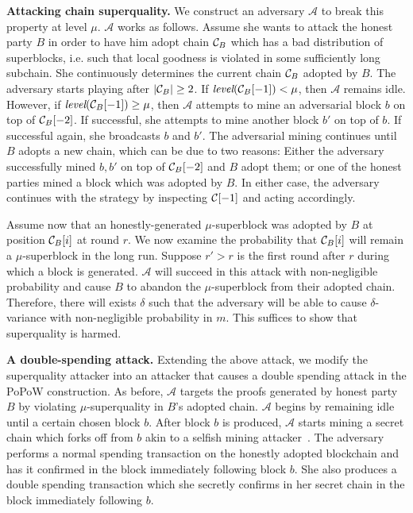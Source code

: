 \noindent
\textbf{Attacking chain superquality.}
\label{subsec.superquality-attack}
We construct an adversary $\mathcal{A}$ to break this property at level $\mu$.
$\mathcal{A}$ works as follows. Assume she wants to attack the honest party $B$
in order to have him adopt chain $\mathcal{C}_B$ which has a bad distribution of
superblocks, i.e. such that local goodness is violated in some sufficiently long
subchain. She continuously determines the current chain $\mathcal{C}_B$ adopted by
$B$. The adversary starts playing after $|\mathcal{C}_B| \geq 2$. If
$\textit{level}(\mathcal{C}_B[-1]) < \mu$, then $\mathcal{A}$ remains idle. However,
if $\textit{level}(\mathcal{C}_B[-1]) \geq \mu$, then $\mathcal{A}$ attempts to mine
an adversarial block $b$ on top of $\mathcal{C}_B[-2]$. If successful,  she attempts
to mine another block $b'$ on top of $b$. If successful again, she broadcasts
$b$ and $b'$. The adversarial mining continues until $B$ adopts a new chain,
which can be due to two reasons: Either the adversary successfully mined $b, b'$
on top of $\mathcal{C}_B[-2]$ and $B$ adopt them; or one of the honest parties mined
a block which was adopted by $B$. In either case, the adversary continues with
the strategy by inspecting $\mathcal{C}[-1]$ and acting accordingly.

Assume now that an honestly-generated $\mu$-superblock was adopted by $B$ at
position $\mathcal{C}_B[i]$ at round $r$. We now examine the probability that
$\mathcal{C}_B[i]$ will remain a $\mu$-superblock in the long run. Suppose $r' > r$
is the first round after $r$ during which a block is generated. $\mathcal{A}$
will succeed in this attack with non-negligible probability and cause $B$ to
abandon the $\mu$-superblock from their adopted chain. Therefore, there will
exists $\delta$ such that the adversary will be able to cause $\delta$-variance
with non-negligible probability in $m$. This suffices to show that superquality
is harmed.

\noindent
\textbf{A double-spending attack. }
Extending the above attack, we modify the superquality attacker into an attacker
that causes a double spending attack in the PoPoW construction. As before,
$\mathcal{A}$ targets the proofs generated by honest party $B$ by violating
$\mu$-superquality in $B$'s adopted chain. $\mathcal{A}$ begins by remaining
idle until a certain chosen block $b$. After block $b$ is produced,
$\mathcal{A}$ starts mining a secret chain which forks off from $b$ akin to a
selfish mining attacker~\cite{selfish}. The adversary performs a normal spending
transaction on the honestly adopted blockchain and has it confirmed in the block
immediately following block $b$. She also produces a double spending transaction
which she secretly confirms in her secret chain in the block immediately
following $b$.

